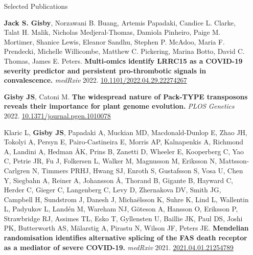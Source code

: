 \documentclass{resume}
\begin{document}
\begin{rSection}{Selected Publications}

\vspace{1pt plus 1pt}

\item \textbf{Jack S. Gisby}\textsuperscript{\textdagger}, Norzawani B. Buang\textsuperscript{\textdagger}, Artemis Papadaki, Candice L. Clarke, Talat H. Malik, Nicholas Medjeral-Thomas, Damiola Pinheiro, Paige M. Mortimer, Shanice Lewis, Eleanor Sandhu, Stephen P. McAdoo, Maria F. Prendecki, Michelle Willicombe, Matthew C. Pickering, Marina Botto, David C. Thomas\textsuperscript{\textdagger}, James E. Peters\textsuperscript{\textdagger}. \textbf{Multi-omics identify LRRC15 as a COVID-19 severity predictor and persistent pro-thrombotic signals in convalescence.} \textit{medRxiv} 2022. \href{https://doi.org/10.1101/2022.04.29.22274267}{10.1101/2022.04.29.22274267}

\vspace{4pt plus 1pt}

\item \textbf{Gisby JS}, Catoni M. \textbf{The widespread nature of Pack-TYPE transposons reveals their importance for plant genome evolution.} \textit{PLOS Genetics} 2022. \href{https://doi.org/10.1371/journal.pgen.1010078}{10.1371/journal.pgen.1010078}

\vspace{4pt plus 1pt}

\item Klaric L\textsuperscript{\textdagger}, \textbf{Gisby JS}\textsuperscript{\textdagger}, Papadaki A\textsuperscript{\textdagger}, Muckian MD, Macdonald-Dunlop E, Zhao JH, Tokolyi A, Persyn E, Pairo-Castineira E, Morris AP, Kalnapenkis A, Richmond A, Landini A, Hedman ÅK, Prins B, Zanetti D, Wheeler E, Kooperberg C, Yao C, Petrie JR, Fu J, Folkersen L, Walker M, Magnusson M, Eriksson N, Mattsson-Carlgren N, Timmers PRHJ, Hwang SJ, Enroth S, Gustafsson S, Vosa U, Chen Y, Siegbahn A, Reiner A, Johansson Å, Thorand B, Gigante B, Hayward C, Herder C, Gieger C, Langenberg C, Levy D, Zhernakova DV, Smith JG, Campbell H, Sundstrom J, Danesh J, Michaëlsson K, Suhre K, Lind L, Wallentin L, Padyukov L, Landén M, Wareham NJ, Göteson A, Hansson O, Eriksson P, Strawbridge RJ, Assimes TL, Esko T, Gyllensten U, Baillie JK, Paul DS, Joshi PK, Butterworth AS, Mälarstig A, Pirastu N, Wilson JF\textsuperscript{\textdagger}, Peters JE\textsuperscript{\textdagger}. \textbf{Mendelian randomisation identifies alternative splicing of the FAS death receptor as a mediator of severe COVID-19.} \textit{medRxiv} 2021. \href{https://doi.org/10.1101/2021.04.01.21254789 }{2021.04.01.21254789}


\end{rSection}
\end{document}
